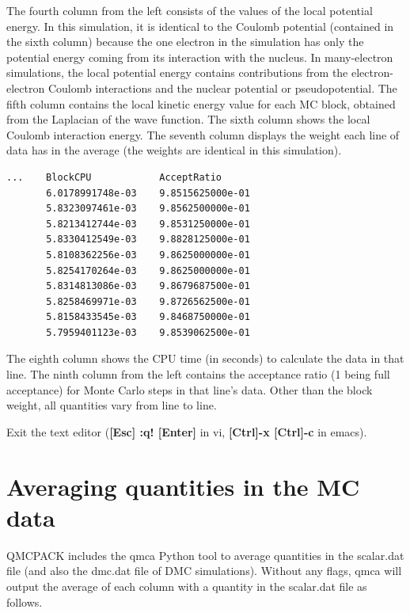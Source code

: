 The fourth column from the left consists of the values of the local potential
energy.  In this simulation, it is identical to the Coulomb potential
(contained in the sixth column) because the one electron in the simulation has
only the potential energy coming from its interaction with the nucleus.  In
many-electron simulations, the local potential energy contains contributions
from the electron-electron Coulomb interactions and the nuclear potential or
pseudopotential.  The fifth column contains the local kinetic energy value for
each MC block, obtained from the Laplacian of the wave function.  The sixth
column shows the local Coulomb interaction energy.  The seventh column displays
the weight each line of data has in the average (the weights are identical in
this simulation).   

\begin{shaded} 
\begin{verbatim} 
...    BlockCPU            AcceptRatio         
       6.0178991748e-03    9.8515625000e-01
       5.8323097461e-03    9.8562500000e-01
       5.8213412744e-03    9.8531250000e-01
       5.8330412549e-03    9.8828125000e-01
       5.8108362256e-03    9.8625000000e-01
       5.8254170264e-03    9.8625000000e-01
       5.8314813086e-03    9.8679687500e-01
       5.8258469971e-03    9.8726562500e-01
       5.8158433545e-03    9.8468750000e-01
       5.7959401123e-03    9.8539062500e-01
\end{verbatim} 
\end{shaded}

The eighth column shows the CPU time (in seconds) to calculate the data in that
line.  The ninth column from the left contains the acceptance ratio (1 being
full acceptance) for Monte Carlo steps in that line's data.  Other than the
block weight, all quantities vary from line to line.

Exit the text editor (\textbf{[Esc] :q! [Enter]} in vi, \textbf{[Ctrl]-x [Ctrl]-c} in
emacs).

\section{Averaging quantities in the MC data}
\label{sec:averaging} 

QMCPACK includes the qmca Python tool to average quantities in the scalar.dat file (and
also the dmc.dat file of DMC simulations).  Without any flags, qmca will output
the average of each column with a quantity in the scalar.dat file as follows. 

